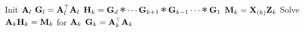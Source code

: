 
\begin{algorithmic}[1]\footnotesize
    
        \State Init $\mathbf{A}_l$
        \State $\mathbf{G}_l = \mathbf{A}_l^\top\mathbf{A}_l$ 
      \EndFor
              \State $\mat{H}_k = \mat{G}_d \hada \cdots \mat{G}_{k+1} \hada \mat{G}_{k-1} \cdots \hada \mat{G}_1$  \label{l:NE-Hada}
              \State $\mathbf{M}_k = \mathbf{X}_{(k)}\mathbf{Z}_k$  \label{l:NE-mttkrp}
              \State Solve $\mathbf{A}_k \mathbf{H}_k = \mathbf{M}_{k}$ for $\mathbf{A}_k$  \label{l:NE-solve}
              \State $\mathbf{G}_k = \mathbf{A}_k^\top\mathbf{A}_k$    \label{l:NE-Gram}
          \EndFor
      \EndWhile
    \EndFunction
    
  \end{algorithmic}